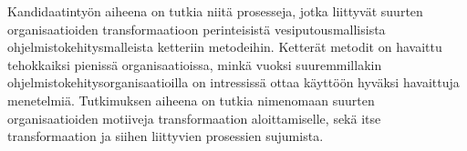 Kandidaatintyön aiheena on tutkia niitä prosesseja, jotka liittyvät suurten
organisaatioiden transformaatioon perinteisistä vesiputousmallisista
ohjelmistokehitysmalleista ketteriin metodeihin. Ketterät metodit on havaittu
tehokkaiksi pienissä organisaatioissa, minkä vuoksi suuremmillakin
ohjelmistokehitysorganisaatioilla on intressissä ottaa käyttöön hyväksi
havaittuja menetelmiä. Tutkimuksen aiheena on tutkia nimenomaan suurten
organisaatioiden motiiveja transformaation aloittamiselle, sekä itse
transformaation ja siihen liittyvien prosessien sujumista.
